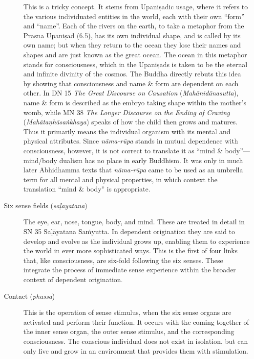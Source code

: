 \documentclass[12pt,openany]{book}%
\begin{document}
\begin{description}
This is a tricky concept. It stems from \textsanskrit{Upaniṣadic} usage, where it refers to the various individuated entities in the world, each with their own “form” and “name”. Each of the rivers on the earth, to take a metaphor from the Prasna \textsanskrit{Upaniṣad} (6.5), has its own individual shape, and is called by its own name; but when they return to the ocean they lose their names and shapes and are just known as the great ocean. The ocean in this metaphor stands for consciousness, which in the \textsanskrit{Upaniṣads} is taken to be the eternal and infinite divinity of the cosmos. The Buddha directly rebuts this idea by showing that consciousness and name \& form are dependent on each other. In DN 15 \textit{The Great Discourse on Causation} (\textit{\textsanskrit{Mahānidānasutta}}), name \& form is described as the embryo taking shape within the mother’s womb, while MN 38 \textit{The Longer Discourse on the Ending of Craving} (\textit{\textsanskrit{Mahātaṇhāsaṅkhaya}}) speaks of how the child then grows and matures. Thus it primarily means the individual organism with its mental and physical attributes. Since \textit{\textsanskrit{nāma}-\textsanskrit{rūpa}} stands in mutual dependence with consciousness, however, it is not correct to translate it as “mind \& body”—mind/body dualism has no place in early Buddhism. It was only in much later Abhidhamma texts that \textit{\textsanskrit{nāma}-\textsanskrit{rūpa}} came to be used as an umbrella term for all mental and physical properties, in which context the translation “mind \& body” is appropriate.%
\item[Six sense fields (\textit{\textsanskrit{saḷāyatana}})] The eye, ear, nose, tongue, body, and mind.
These are treated in detail in SN 35 \textsanskrit{Saḷāyatana} \textsanskrit{Saṁyutta}. In dependent origination they are said to develop and evolve as the individual grows up, enabling them to experience the world in ever more sophisticated ways. This is the first of four links that, like consciousness, are six-fold following the six senses. These integrate the process of immediate sense experience within the broader context of dependent origination.%
\item[Contact (\textit{phassa})] This is the operation of sense stimulus, when the six sense organs are activated and perform their function. It occurs with the coming together of the inner sense organ, the outer sense stimulus, and the corresponding consciousness.
The conscious individual does not exist in isolation, but can only live and grow in an environment that provides them with stimulation.%

\end{description}
\end{document}
